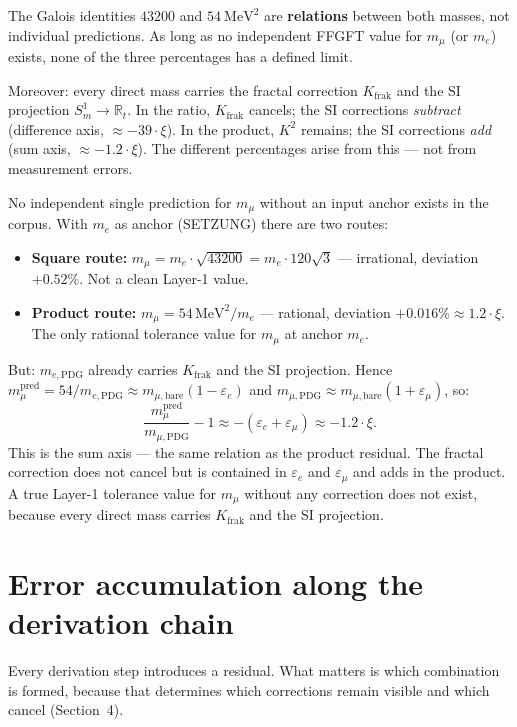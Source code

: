 The Galois identities $43200$ and $54~\text{MeV}^2$ are
\textbf{relations} between both masses, not individual predictions.
As long as no independent FFGFT value for $m_\mu$ (or $m_e$)
exists, none of the three percentages has a defined limit.

Moreover: every direct mass carries the fractal correction
$K_\text{frak}$ and the SI projection $S^1_m\to\mathbb{R}_t$.
In the ratio, $K_\text{frak}$ cancels; the SI corrections
\emph{subtract} (difference axis, $\approx -39\cdot\xi$).
In the product, $K^2$ remains; the SI corrections \emph{add}
(sum axis, $\approx -1.2\cdot\xi$). The different percentages
arise from this --- not from measurement errors.

No independent single prediction for $m_\mu$ without an input anchor
exists in the corpus. With $m_e$ as anchor (SETZUNG) there are two routes:
\begin{itemize}\itemsep2pt
\item \textbf{Square route:} $m_\mu = m_e\cdot\sqrt{43200} = m_e\cdot120\sqrt{3}$ ---
  irrational, deviation $+0.52\%$. Not a clean Layer-1 value.
\item \textbf{Product route:} $m_\mu = 54\,\text{MeV}^2/m_e$ --- rational,
  deviation $+0.016\%\approx1.2\cdot\xi$. The only rational tolerance
  value for $m_\mu$ at anchor $m_e$.
\end{itemize}
But: $m_{e,\text{PDG}}$ already carries $K_\text{frak}$ and the SI projection.
Hence $m_\mu^\text{pred}=54/m_{e,\text{PDG}}\approx m_{\mu,\text{bare}}(1-\varepsilon_e)$
and $m_{\mu,\text{PDG}}\approx m_{\mu,\text{bare}}(1+\varepsilon_\mu)$, so:
\[
\frac{m_\mu^\text{pred}}{m_{\mu,\text{PDG}}}-1
\approx -(\varepsilon_e+\varepsilon_\mu) \approx -1.2\cdot\xi .
\]
This is the sum axis --- the same relation as the product residual.
The fractal correction does not cancel but is contained in
$\varepsilon_e$ and $\varepsilon_\mu$ and adds in the product.
A true Layer-1 tolerance value for $m_\mu$ without any correction
does not exist, because every direct mass carries $K_\text{frak}$
and the SI projection.

\section{Error accumulation along the derivation chain}

Every derivation step introduces a residual. What matters is which combination
is formed, because that determines which corrections remain visible and which
cancel (Section~4).


